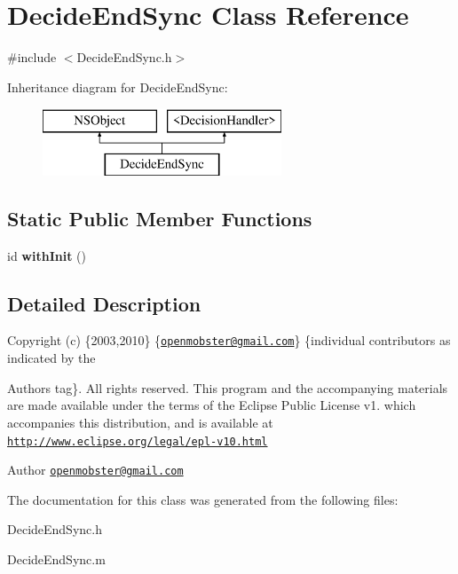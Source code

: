 \hypertarget{interface_decide_end_sync}{
\section{\-Decide\-End\-Sync \-Class \-Reference}
\label{interface_decide_end_sync}
}


{\ttfamily \#include $<$\-Decide\-End\-Sync.\-h$>$}

\-Inheritance diagram for \-Decide\-End\-Sync\-:\begin{figure}[H]
\begin{center}
\leavevmode
\includegraphics[height=2.000000cm]{interface_decide_end_sync}
\end{center}
\end{figure}
\subsection*{\-Static \-Public \-Member \-Functions}
\begin{DoxyCompactItemize}
\item 
\hypertarget{interface_decide_end_sync_a929e5142dcc5f034e2093503c05bdc8b}{
id {\bfseries with\-Init} ()}
\label{interface_decide_end_sync_a929e5142dcc5f034e2093503c05bdc8b}

\end{DoxyCompactItemize}


\subsection{\-Detailed \-Description}
\-Copyright (c) \{2003,2010\} \{\href{mailto:openmobster@gmail.com}{\tt openmobster@gmail.\-com}\} \{individual contributors as indicated by the \begin{DoxyAuthor}{\-Authors}
tag\}. \-All rights reserved. \-This program and the accompanying materials are made available under the terms of the \-Eclipse \-Public \-License v1. which accompanies this distribution, and is available at \href{http://www.eclipse.org/legal/epl-v10.html}{\tt http\-://www.\-eclipse.\-org/legal/epl-\/v10.\-html}
\end{DoxyAuthor}
\begin{DoxyAuthor}{\-Author}
\href{mailto:openmobster@gmail.com}{\tt openmobster@gmail.\-com} 
\end{DoxyAuthor}


\-The documentation for this class was generated from the following files\-:\begin{DoxyCompactItemize}
\item 
\-Decide\-End\-Sync.\-h\item 
\-Decide\-End\-Sync.\-m\end{DoxyCompactItemize}
